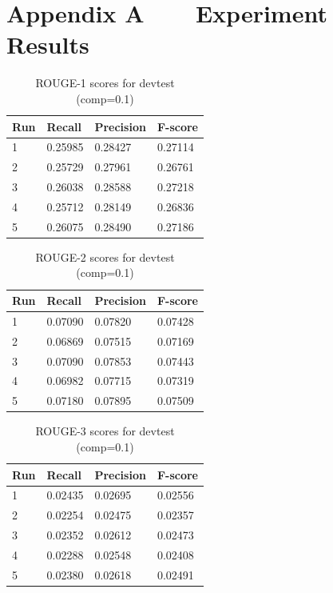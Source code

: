 \documentclass[11pt]{article}
\begin{document}
\section*{Appendix A\ \ \ \  Experiment Results}
\begin{table}[!ht]
\centering
\caption*{ROUGE-1 scores for devtest (comp=0.1)}
\begin{tabular}{|l|l|l|l|}
\hline
Run   & Recall  & Precision & F-score \\ \hline
1 & 0.25985 & 0.28427   & 0.27114 \\ \hline
2 & 0.25729 & 0.27961   & 0.26761 \\ \hline
3 & 0.26038 & 0.28588   & 0.27218 \\ \hline
4 & 0.25712 & 0.28149   & 0.26836 \\ \hline
5 & 0.26075 & 0.28490   & 0.27186 \\ \hline
\end{tabular}
\end{table}

\begin{table}[!ht]
\centering
\caption*{ROUGE-2 scores for devtest (comp=0.1)}
\begin{tabular}{|l|l|l|l|}
\hline
Run   & Recall  & Precision & F-score \\ \hline
1 & 0.07090 & 0.07820   & 0.07428 \\ \hline
2 & 0.06869 & 0.07515   & 0.07169 \\ \hline
3 & 0.07090 & 0.07853   & 0.07443 \\ \hline
4 & 0.06982 & 0.07715   & 0.07319 \\ \hline
5 & 0.07180 & 0.07895   & 0.07509 \\ \hline
\end{tabular}
\end{table}

\begin{table}[!ht]
\centering
\caption*{ROUGE-3 scores for devtest (comp=0.1)}
\begin{tabular}{|l|l|l|l|}
\hline
Run   & Recall  & Precision & F-score \\ \hline
1 & 0.02435 & 0.02695   & 0.02556 \\ \hline
2 & 0.02254 & 0.02475   & 0.02357 \\ \hline
3 & 0.02352 & 0.02612   & 0.02473 \\ \hline
4 & 0.02288 & 0.02548   & 0.02408 \\ \hline
5 & 0.02380 & 0.02618   & 0.02491 \\ \hline
\end{tabular}
\end{table}
\end{document}
